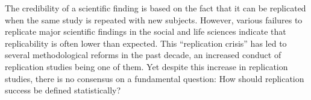 The credibility of a scientific finding is based on the fact that it can be
replicated when the same study is repeated with new subjects. However, various
failures to replicate major scientific findings in the social and life sciences
indicate that replicability is often lower than expected. This ``replication
crisis'' has led to several methodological reforms in the past decade, an
increased conduct of replication studies being one of them. Yet despite this
increase in replication studies, there is no consensus on a fundamental
question: How should replication success be defined statistically?

